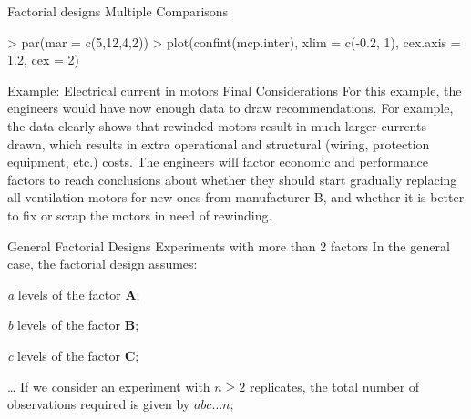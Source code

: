 \documentclass[t]{beamer}
\begin{document}

\begin{ftstf}
{Factorial designs}
{Multiple Comparisons}
\begin{rcode}
> par(mar = c(5,12,4,2))
> plot(confint(mcp.inter), xlim = c(-0.2, 1), cex.axis = 1.2, cex = 2)
\end{rcode}
\end{ftstf}


\begin{ftst}
{Example: Electrical current in motors}
{Final Considerations}
For this example, the engineers would have now enough data to draw recommendations. For example, the data clearly shows that rewinded motors result in much larger currents drawn, which results in extra operational and structural (wiring, protection equipment, etc.) costs.
\vone
The engineers will factor economic and performance factors to reach conclusions about whether they should start gradually replacing all ventilation motors for new ones from manufacturer B, and whether it is better to fix or scrap the motors in need of rewinding.
\end{ftst}


\begin{ftst}
{General Factorial Designs}
{Experiments with more than 2 factors}
In the general case, the factorial design assumes:

\bitems \textit{a} levels of the factor \textbf{A};
\item \textit{b} levels of the factor \textbf{B};
\item \textit{c} levels of the factor \textbf{C};
\item\ldots
\eitem
\vhalf
If we consider an experiment with $n\geq 2$ replicates, the total number of observations required is given by $abc\ldots n$;
\end{ftst}
\end{document}
